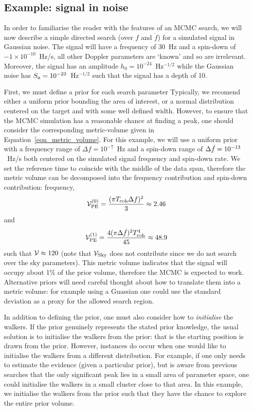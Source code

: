 \documentclass[aps, prd, twocolumn, superscriptaddress, floatfix, showpacs, nofootinbib, longbibliography]{revtex4-1}
\begin{document}
\subsection{Example: signal in noise}

In order to familiarise the reader with the features of an MCMC search, we will
now describe a simple directed search (over $f$ and $\dot{f}$) for a simulated
signal in Gaussian noise. The signal will have a frequency of $30$~Hz and a
spin-down of $-1{\times}10^{-10}$~Hz/s, all other Doppler parameters are
`known' and so are irrelevant. Moreover, the signal has an amplitude
$h_0=10^{-24}$~Hz$^{-1/2}$ while the Gaussian noise has
$S_{\rm n}=10^{-23}$~Hz$^{-1/2}$ such that the signal has a depth of 10.

First, we must define a prior for each search parameter Typically, we recomend
either a uniform prior bounding the area of interest, or a normal distribution
centered on the target and with some well defined width. However, to ensure
that the MCMC simulation has a reasonable chance at finding a peak, one should
consider the corresponding metric-volume given in
Equation~\eqref{eqn_metric_volume}. For this example, we will use a uniform
prior with a frequency range of $\Delta f = 10^{-7}$~Hz and a spin-down range
of $\Delta \dot{f}=10^{-13}$~Hz/s both centered on the simulated signal frequency
and spin-down rate. We set the reference time to coincide with the middle of
the data span, therefore the metric volume can be decomposed into the frequency
contribution and spin-down contribution:
frequency,
\begin{align}
\mathcal{V}_{\rm PE}^{(0)} = \frac{(\pi T_{\rm coh}\Delta f)^2}{3} \approx 2.46
\end{align}
and
\begin{align}
\mathcal{V}_{\rm PE}^{(1)} = \frac{4(\pi\Delta \dot{f})^2T_{\rm coh}^{4}}{45} \approx 48.9
\end{align}
such that $\mathcal{V}\approx120$ (note that $\mathcal{V}_{\rm Sky}$ does not contribute since we do
not search over the sky parameters). This metric volume indicates that the
signal will occupy about 1\% of the prior volume, therefore the MCMC is
expected to work. Alternative priors will need careful thought about how to
translate them into a metric volume: for example using a Guassian one could use
the standard deviation as a proxy for the allowed search region.

In addition to defining the prior, one must also consider how to
\emph{initialise} the walkers. If the prior genuinely represents the stated
prior knowledge, the usual solution is to initialise the walkers from the
prior: that is the starting position is drawn from the prior. However,
instances do occur when one would like to initialise the walkers from a
different distribution. For example, if one only needs to estimate the evidence
(given a particular prior), but is aware from previous searches that the only
significant peak lies in a small area of parameter space, one could initialise
the walkers in a small cluster close to that area. In this example, we
initialise the walkers from the prior such that they have the chance to explore
the entire prior volume.
\end{document}
